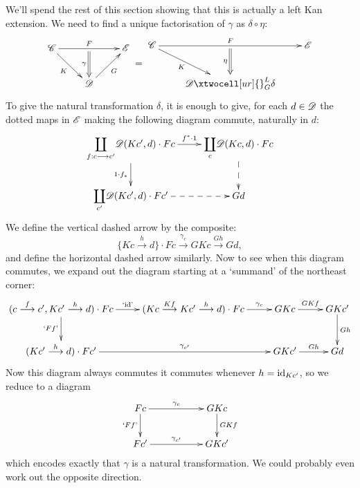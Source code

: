 \documentclass[11pt]{article}
\begin{document}
We'll spend the rest of this section showing that this is actually a left Kan extension. We need %
to find a unique factorisation of $\gamma$ as $\delta\circ\eta$:
\[\vcenter{\xymatrix{
\scrC\ar[rd]_-{K}\ar[rr]^-{F}_-{}="arF"&%
&%
\scrE\\%
&%
\scrD\ar@{=>}"arF";[]_-{\gamma}
\ar[ur]_-{G}
}}
=
\vcenter{\xymatrix{
\scrC\ar[rd]_-{K}\ar[rr]^-{F}_-{}="arF"&%
&%
\scrE\\%
&%
\scrD\ar@{=>}"arF";[]_-{\eta}
\xtwocell[ur]{}_{G}^{L}{{\delta}}&%
}}
\]
To give the natural transformation $\delta$, it is enough to give, for each $d\in\mathscr{D}$ the dotted maps in $\mathscr{E}$ making the following diagram commute, naturally in $d$:
\[\vcenter{\xymatrix{
{\displaystyle\coprod_{f:c\to c'}}\scrD(Kc',d)\cdot Fc\ar[r]^-{f^*\cdot1}\ar[d]_-{1\cdot f_*}&%
\ar@{-->}[d]{\displaystyle\coprod_{c}}\scrD(Kc,d)\cdot Fc\\%
\ar@{-->}[r]{\displaystyle\coprod_{c'}}\scrD(Kc',d)\cdot Fc'&%
Gd%
}}\]
We define the vertical dashed arrow by the composite:
\[\{Kc\overset{h}{\to}d\}\cdot Fc\overset{\gamma_c}{\to}GKc\overset{Gh}{\to}Gd,\]
and define the horizontal dashed arrow similarly. Now to see when this diagram commutes, we expand out the diagram starting at a `summand' of the northeast corner:
\[\vcenter{\xymatrix{
(c\overset{f}{\to}c',Kc'\overset{h}{\to}d)\cdot Fc\ar@{->}[r]^-{\textup{`id'}}\ar[d]_-{\textup{`$Ff$'}}&%
\ar@{->}[r]^-{\gamma_c}(Kc\overset{Kf}{\to}Kc'\overset{h}{\to}d)\cdot Fc&%
GKc\ar[r]^-{GKf}&
GKc'\ar[d]^-{Gh}\\
\ar@{->}[rr]^-{\gamma_{c'}}(Kc'\overset{h}{\to}d)\cdot Fc'&&
GKc'\ar[r]^-{Gh}&Gd
}}\]
Now this diagram always commutes \Iff it commutes whenever $h=\textup{id}_{Kc'}$, so we reduce to a diagram
\[\vcenter{\xymatrix{
Fc\ar@{->}[rr]^-{\gamma_c}\ar[d]_-{\textup{`$Ff$'}}&&%
GKc\ar[d]^-{GKf}\\
\ar@{->}[rr]^-{\gamma_{c'}}Fc'&&
GKc'
}}\]
which encodes exactly that $\gamma$ is a natural transformation. We could probably even work out the opposite direction.
\end{document}

